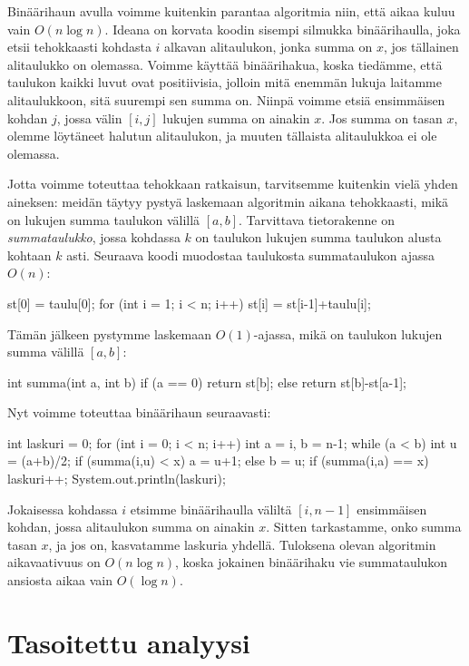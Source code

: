 Binäärihaun avulla voimme kuitenkin parantaa algoritmia niin,
että aikaa kuluu vain $O(n \log n)$.
Ideana on korvata koodin sisempi silmukka
binääri\-haulla, joka etsii tehokkaasti kohdasta $i$
alkavan alitaulukon, jonka summa on $x$, jos tällainen alitaulukko on olemassa.
Voimme käyttää binäärihakua, koska tiedämme, että taulukon kaikki
luvut ovat positiivisia, jolloin mitä enemmän lukuja laitamme alitaulukkoon,
sitä suurempi sen summa on.
Niinpä voimme etsiä ensimmäisen kohdan $j$,
jossa välin $[i,j]$ lukujen summa on ainakin $x$.
Jos summa on tasan $x$, olemme löytäneet halutun alitaulukon,
ja muuten tällaista alitaulukkoa ei ole olemassa.

Jotta voimme toteuttaa tehokkaan ratkaisun,
tarvitsemme kuitenkin vielä yhden aineksen:
meidän täytyy pystyä laskemaan algoritmin aikana tehokkaasti,
mikä on lukujen summa taulukon välillä $[a,b]$.
Tarvittava tietorakenne on \emph{summataulukko},
jossa kohdassa $k$ on taulukon
lukujen summa taulukon alusta kohtaan $k$ asti.
Seuraava koodi muodostaa taulukosta summataulukon ajassa $O(n)$:

\begin{code}
st[0] = taulu[0];
for (int i = 1; i < n; i++) {
    st[i] = st[i-1]+taulu[i];
}
\end{code}

Tämän jälkeen pystymme laskemaan $O(1)$-ajassa,
mikä on taulukon lukujen summa välillä $[a,b]$:

\begin{code}
int summa(int a, int b) {
    if (a == 0) return st[b];
    else return st[b]-st[a-1];
}
\end{code}

Nyt voimme toteuttaa binäärihaun seuraavasti:

\begin{code}
int laskuri = 0;
for (int i = 0; i < n; i++) {
    int a = i, b = n-1;
    while (a < b) {
        int u = (a+b)/2;
        if (summa(i,u) < x) a = u+1;
        else b = u;
    }
    if (summa(i,a) == x) laskuri++;
}
System.out.println(laskuri);
\end{code}

Jokaisessa kohdassa $i$ etsimme binäärihaulla väliltä $[i,n-1]$
ensimmäisen kohdan, jossa alitaulukon summa on ainakin $x$.
Sitten tarkastamme, onko summa tasan $x$,
ja jos on, kasvatamme laskuria yhdellä.
Tuloksena olevan algoritmin aikavaativuus on $O(n \log n)$,
koska jokainen binäärihaku vie summataulukon ansiosta
aikaa vain $O(\log n)$.

\section{Tasoitettu analyysi}

